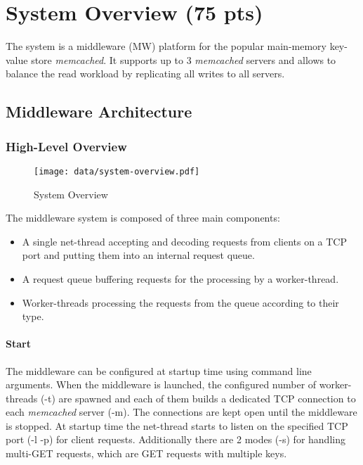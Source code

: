 \documentclass[report.tex]{subfiles}
\begin{document}
\section{System Overview (75 pts)}

The system is a middleware (MW) platform for the popular main-memory key-value store \emph{memcached}\cite{memcached}.
It supports up to 3 \emph{memcached} servers and allows to balance the read workload by replicating all writes to all servers.


\subsection{Middleware Architecture}
\subsubsection{High-Level Overview}

\begin{figure}
	\centering
	\texttt{[image: data/system-overview.pdf]}
	\caption{System Overview}
\end{figure}

The middleware system is composed of three main components:

\begin{itemize}
\vitemsep
\item A single net-thread accepting and decoding requests from clients on a TCP port and putting them into an internal request queue.
\item A request queue buffering requests for the processing by a worker-thread.
\item Worker-threads processing the requests from the queue according to their type.
\end{itemize}

\paragraph{Start}
The middleware can be configured at startup time using command line arguments. When the middleware is launched, the configured number of worker-threads (-t) are spawned and each of them builds a dedicated TCP connection to each \emph{memcached} server (-m). The connections are kept open until the middleware is stopped. At startup time the net-thread starts to listen on the specified TCP port (-l -p) for client requests.
Additionally there are 2 modes (-s) for handling multi-GET requests, which are GET requests with multiple keys. 
\end{document}
